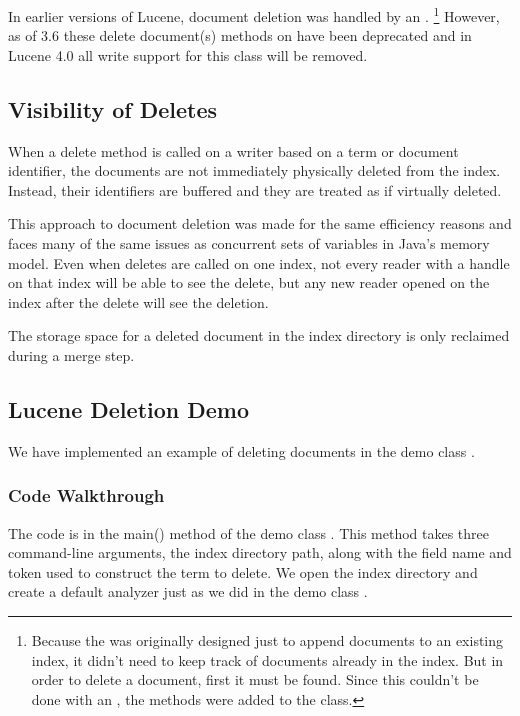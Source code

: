 In earlier versions of Lucene, document deletion was handled by
an .%
%
\footnote{Because the  was originally designed just
  to append documents to an existing index, it didn't need to keep
  track of documents already in the index.  But in order to delete a
  document, first it must be found.  Since this couldn't be done
  with an , the  methods were
  added to the  class.}
%
However, as of 3.6 these delete document(s) methods on  have
been deprecated and in Lucene 4.0 all write support for this class will be removed.

\subsection{Visibility of Deletes}

When a delete method is called on a writer based on a term
or document identifier, the documents are not immediately physically
deleted from the index.  Instead, their identifiers are buffered and
they are treated as if virtually deleted.  

This approach to document deletion was made for the same efficiency
reasons and faces many of the same issues as concurrent sets of
variables in Java's memory model.  Even when deletes are called on one
index, not every reader with a handle on that index will be
able to see the delete, but any new reader opened on the index after the
delete will see the deletion.

The storage space for a deleted document in the index directory is
only reclaimed during a merge step.

\subsection{Lucene Deletion Demo}

We have implemented an example of deleting documents in the 
demo class .

\subsubsection{Code Walkthrough}

The code is in the main() method of the demo class .
This method takes three command-line arguments, the index directory path, along
with the field name and token used to construct the term to delete.
We open the index directory and create a default analyzer just as
we did in the demo class .

